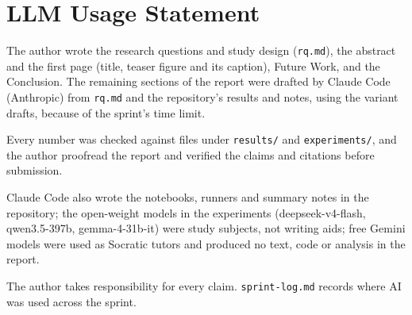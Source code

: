 \documentclass[sigconf,nonacm,screen]{acmart}
\begin{document}
\section*{LLM Usage Statement}

The author wrote the research questions and study design (\texttt{rq.md}), the abstract and the first page (title, teaser figure and its caption), Future Work, and the Conclusion. The remaining sections of the report were drafted by Claude Code (Anthropic) from \texttt{rq.md} and the repository's results and notes, using the variant drafts, because of the sprint's time limit.

Every number was checked against files under \texttt{results/} and \texttt{experiments/}, and the author proofread the report and verified the claims and citations before submission.

Claude Code also wrote the notebooks, runners and summary notes in the repository; the open-weight models in the experiments (deepseek-v4-flash, qwen3.5-397b, gemma-4-31b-it) were study subjects, not writing aids; free Gemini models were used as Socratic tutors and produced no text, code or analysis in the report.

The author takes responsibility for every claim. \texttt{sprint-log.md} records where AI was used across the sprint.
\end{document}
